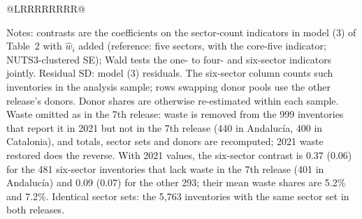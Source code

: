 \begin{table}[width=\linewidth,pos=htbp]
\begin{tabular*}{\tblwidth}{@{}LRRRRRRRR@{}}
\bottomrule
\end{tabular*}
\par\smallskip\begin{minipage}{\linewidth}\footnotesize Notes: contrasts are the coefficients on the sector-count indicators in model (3) of Table~2 with $\hat w_i$ added (reference: five sectors, with the core-five indicator; NUTS3-clustered SE); Wald tests the one- to four- and six-sector indicators jointly. Residual SD: model (3) residuals. The six-sector column counts such inventories in the analysis sample; rows swapping donor pools use the other release's donors. Donor shares are otherwise re-estimated within each sample. Waste omitted as in the 7th release: waste is removed from the 999 inventories that report it in 2021 but not in the 7th release (440 in Andaluc\'ia, 400 in Catalonia), and totals, sector sets and donors are recomputed; 2021 waste restored does the reverse. With 2021 values, the six-sector contrast is 0.37 (0.06) for the 481 six-sector inventories that lack waste in the 7th release (401 in Andaluc\'ia) and 0.09 (0.07) for the other 293; their mean waste shares are 5.2\% and 7.2\%. Identical sector sets: the 5,763 inventories with the same sector set in both releases.\end{minipage}
\end{table}

